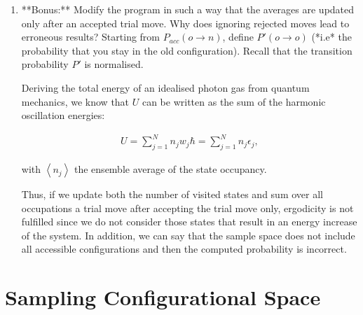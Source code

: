\documentclass[12pt,letterpaper]{report}
\begin{document}
\begin{enumerate}
		\item
		**Bonus:** Modify the program in such a way that the averages are updated only after an accepted trial move. Why does ignoring rejected moves lead to erroneous results? Starting from $P_{acc} ( o \rightarrow n)$, define $P'(o \rightarrow o)$ (*i.e*	the probability that you stay in the old configuration). Recall that
		the transition probability $P'$ is normalised.
		
		Deriving the total energy of an idealised photon gas from quantum mechanics, we know that $U$ can be	written as the sum of the harmonic oscillation energies:
		
		$$
		\begin{aligned}
		U= \sum_{j=1}^{N} n_j w_j \hbar = \sum_{j=1}^{N} n_j \epsilon_j,
		\end{aligned}
		$$
		
		with $\left<n_j\right>$ the ensemble average of the state occupancy.
		
		Thus, if we update both the number of visited states and sum over all occupations a trial move after accepting the trial move only, ergodicity is not fulfilled since we do not consider those states that result in an energy increase of the system. In addition, we can say that the sample space does not include all accessible configurations and then the computed probability is incorrect.  


	\end{enumerate}
  
  \section*{Sampling Configurational Space}
  
\end{document}
